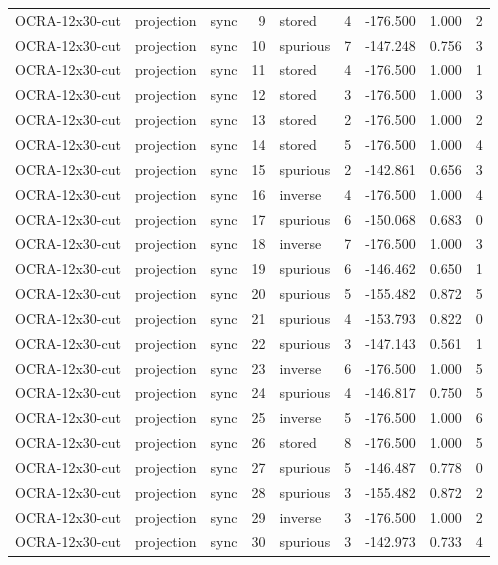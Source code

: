 \begin{tabular}{lllrlrrrr}
OCRA-12x30-cut & projection & sync & 9 & stored & 4 & -176.500 & 1.000 & 2 \\
OCRA-12x30-cut & projection & sync & 10 & spurious & 7 & -147.248 & 0.756 & 3 \\
OCRA-12x30-cut & projection & sync & 11 & stored & 4 & -176.500 & 1.000 & 1 \\
OCRA-12x30-cut & projection & sync & 12 & stored & 3 & -176.500 & 1.000 & 3 \\
OCRA-12x30-cut & projection & sync & 13 & stored & 2 & -176.500 & 1.000 & 2 \\
OCRA-12x30-cut & projection & sync & 14 & stored & 5 & -176.500 & 1.000 & 4 \\
OCRA-12x30-cut & projection & sync & 15 & spurious & 2 & -142.861 & 0.656 & 3 \\
OCRA-12x30-cut & projection & sync & 16 & inverse & 4 & -176.500 & 1.000 & 4 \\
OCRA-12x30-cut & projection & sync & 17 & spurious & 6 & -150.068 & 0.683 & 0 \\
OCRA-12x30-cut & projection & sync & 18 & inverse & 7 & -176.500 & 1.000 & 3 \\
OCRA-12x30-cut & projection & sync & 19 & spurious & 6 & -146.462 & 0.650 & 1 \\
OCRA-12x30-cut & projection & sync & 20 & spurious & 5 & -155.482 & 0.872 & 5 \\
OCRA-12x30-cut & projection & sync & 21 & spurious & 4 & -153.793 & 0.822 & 0 \\
OCRA-12x30-cut & projection & sync & 22 & spurious & 3 & -147.143 & 0.561 & 1 \\
OCRA-12x30-cut & projection & sync & 23 & inverse & 6 & -176.500 & 1.000 & 5 \\
OCRA-12x30-cut & projection & sync & 24 & spurious & 4 & -146.817 & 0.750 & 5 \\
OCRA-12x30-cut & projection & sync & 25 & inverse & 5 & -176.500 & 1.000 & 6 \\
OCRA-12x30-cut & projection & sync & 26 & stored & 8 & -176.500 & 1.000 & 5 \\
OCRA-12x30-cut & projection & sync & 27 & spurious & 5 & -146.487 & 0.778 & 0 \\
OCRA-12x30-cut & projection & sync & 28 & spurious & 3 & -155.482 & 0.872 & 2 \\
OCRA-12x30-cut & projection & sync & 29 & inverse & 3 & -176.500 & 1.000 & 2 \\
OCRA-12x30-cut & projection & sync & 30 & spurious & 3 & -142.973 & 0.733 & 4 \\

\end{tabular}

